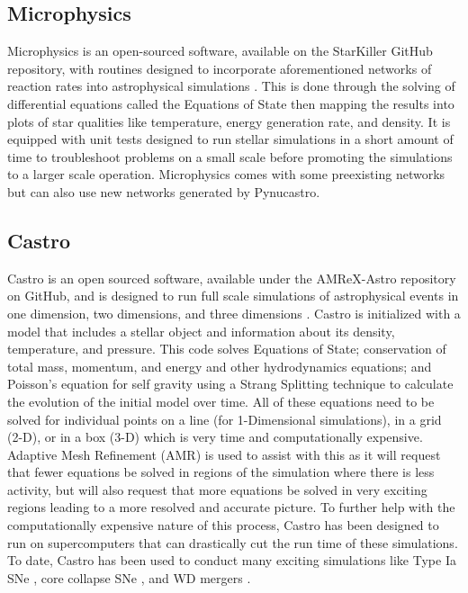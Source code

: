 \documentclass[preprint]{aastex62}
\begin{document}
  \subsection{Microphysics}
  
    Microphysics is an open-sourced software, available on the StarKiller GitHub repository, with routines designed to incorporate aforementioned networks of reaction rates into astrophysical simulations \citep{Microphysics}. This is done through the solving of differential equations called the Equations of State then mapping the results into plots of star qualities like temperature, energy generation rate, and density. It is equipped with unit tests designed to run stellar simulations in a short amount of time to troubleshoot problems on a small scale before promoting the simulations to a larger scale operation. Microphysics comes with some preexisting networks but can also use new networks generated by Pynucastro. 
  
  \subsection{Castro}
  
    Castro is an open sourced software, available under the AMReX-Astro repository on GitHub, and is designed to run full scale simulations of astrophysical events in one dimension, two dimensions, and three dimensions \citep{castro}. Castro is initialized with a model that includes a stellar object and information about its density, temperature, and pressure. This code solves Equations of State; conservation of total mass, momentum, and energy and other hydrodynamics equations; and Poisson's equation for self gravity using a Strang Splitting technique \citep{strang} to calculate the evolution of the initial model over time. All of these equations need to be solved for individual points on a line (for 1-Dimensional simulations), in a grid (2-D), or in a box (3-D) which is very time and computationally expensive. Adaptive Mesh Refinement (AMR) is used to assist with this as it will request that fewer equations be solved in regions of the simulation where there is less activity, but will also request that more equations be solved in very exciting regions leading to a more resolved and accurate picture. To further help with the computationally expensive nature of this process, Castro has been designed to run on supercomputers that can drastically cut the run time of these simulations. To date, Castro has been used to conduct many exciting simulations like Type Ia SNe \citep{subch1, subch2}, core collapse SNe \citep{corecollapse1, corecollapse2}, and WD mergers \citep{merger}. 
  
\end{document}
